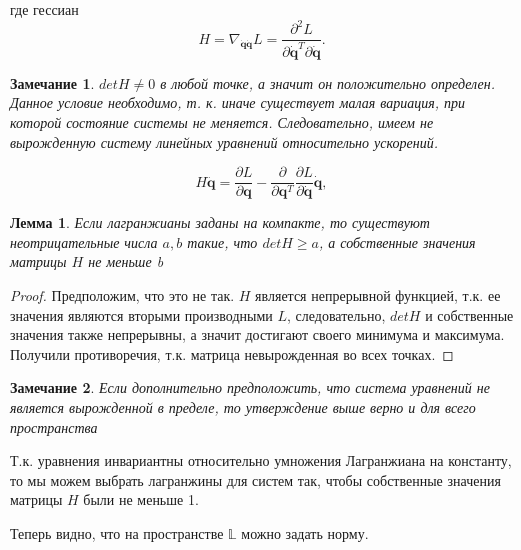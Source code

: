 \documentclass[12pt, twoside]{article}
\newtheorem{remark}{Замечание}
\newtheorem{lemma}{Лемма}
\begin{document}
где гессиан 
\begin{equation}
H = \nabla_{\dot{\mathbf{q}}\dot{\mathbf{q}}} L = \frac{\partial^{2} L}{\partial \dot{\mathbf{q}}^T \partial \dot{\mathbf{q}}}.
\end{equation}
\begin{remark} \label{remark1}
$det H \neq 0$ в любой точке, а значит он положительно определен. Данное условие необходимо, т. к. иначе существует малая вариация, при которой состояние системы не меняется. Следовательно, имеем не вырожденную систему линейных уравнений относительно ускорений.

\begin{equation}
\label{eq:linear_equation_acc}
H\ddot{\mathbf{q}} 
= \frac{\partial L}{\partial \mathbf{q}}-\frac{\partial}{\partial \mathbf{q}^T} \frac{\partial L}{\partial \dot{\mathbf{q}}} \dot{\mathbf{q}},
\end{equation}

\end{remark}

\begin{lemma} \label{lemma1}
Если лагранжианы заданы на компакте, то существуют неотрицательные числа $a, b$ такие, что $det H \ge a$, а собственные значения матрицы $H$ не меньше b
\end{lemma}
\begin{proof}
Предположим, что это не так. $H$ является непрерывной функцией, т.к. ее значения являются вторыми производными $L$, следовательно, $det H$ и собственные значения также непрерывны, а значит достигают своего минимума и максимума. Получили противоречия, т.к. матрица невырожденная во всех точках.
\end{proof}

\begin{remark} \label{remark2}
Если дополнительно предположить, что система уравнений не является вырожденной в пределе, то утверждение выше верно и для всего пространства
\end{remark}

Т.к. уравнения инвариантны относительно умножения Лагранжиана на константу, то мы можем выбрать лагранжины для систем так, чтобы собственные значения матрицы $H$ были не меньше 1.

Теперь видно, что на пространстве $\mathbb{L}$ можно задать норму. 
\end{document}
